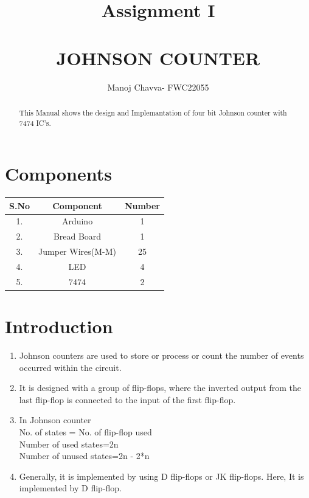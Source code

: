 \documentclass[journal,12pt,twocolumn]{IEEEtran}
\title{Assignment \textrm{I} \\ \textbf{\\JOHNSON COUNTER}}
\author{Manoj Chavva- FWC22055}
\begin{document}
\maketitle

\tableofcontents
\vspace{0.5cm}
\begin{abstract}
  This Manual shows the design and Implemantation of four bit Johnson counter with 7474 IC's.
\end{abstract}   


 
     \section{Components}  
       

\begin{tabular}{|c|c|c|}
    \hline 
      \textbf{S.No} & \textbf{Component} & \textbf{Number}\\
      \hline
	1. & Arduino & 1 \\
	2. & Bread Board & 1 \\
	3. & Jumper Wires(M-M) & 25 \\
	4. & LED & 4 \\
	5. & 7474 & 2\\
      \hline
      
   \end{tabular}
   

     \vspace{0.35cm}




\section{Introduction}
\begin{enumerate}
  \item Johnson counters are used to store or process or count the number of events occurred within the circuit.
  \item It is designed with a group of flip-flops, where the inverted output from the last flip-flop is connected to the input of the first flip-flop.
  \item In Johnson counter
  \\No. of states = No. of flip-flop used  
\\Number of used states=2n  
\\Number of unused states=2n - 2*n  
\item Generally, it is implemented by using D flip-flops or JK flip-flops. 
Here, It is implemented by D flip-flop.
\end{enumerate}
\end{document}
